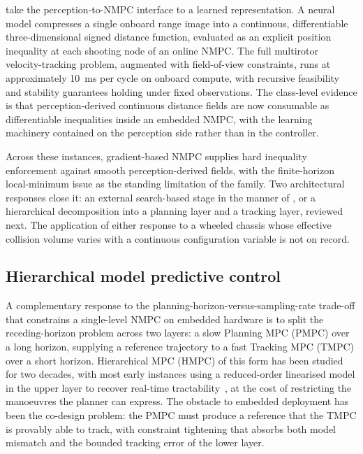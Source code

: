 \documentclass[11pt,a4paper]{article}
\begin{document}
\citet{jacquet2025sdfnmpc} take the perception-to-NMPC interface to a learned representation. A neural model compresses a single onboard range image into a continuous, differentiable three-dimensional signed distance function, evaluated as an explicit position inequality at each shooting node of an online NMPC. The full multirotor velocity-tracking problem, augmented with field-of-view constraints, runs at approximately \SI{10}{\milli\second} per cycle on onboard compute, with recursive feasibility and stability guarantees holding under fixed observations. The class-level evidence is that perception-derived continuous distance fields are now consumable as differentiable inequalities inside an embedded NMPC, with the learning machinery contained on the perception side rather than in the controller.

Across these instances, gradient-based NMPC supplies hard inequality enforcement against smooth perception-derived fields, with the finite-horizon local-minimum issue as the standing limitation of the family. Two architectural responses close it: an external search-based stage in the manner of \citet{kohlerMPCFrameworkEfficient2025}, or a hierarchical decomposition into a planning layer and a tracking layer, reviewed next. The application of either response to a wheeled chassis whose effective collision volume varies with a continuous configuration variable is not on record.

\subsection{Hierarchical model predictive control}
\label{sec:sq4:hmpc}

A complementary response to the planning-horizon-versus-sampling-rate trade-off that constrains a single-level NMPC on embedded hardware is to split the receding-horizon problem across two layers: a slow Planning MPC (PMPC) over a long horizon, supplying a reference trajectory to a fast Tracking MPC (TMPC) over a short horizon. Hierarchical MPC (HMPC) of this form has been studied for two decades, with most early instances using a reduced-order linearised model in the upper layer to recover real-time tractability~\cite{farina2017hierarchical,raghuraman2022adjustable}, at the cost of restricting the manoeuvres the planner can express. The obstacle to embedded deployment has been the co-design problem: the PMPC must produce a reference that the TMPC is provably able to track, with constraint tightening that absorbs both model mismatch and the bounded tracking error of the lower layer.
\end{document}
